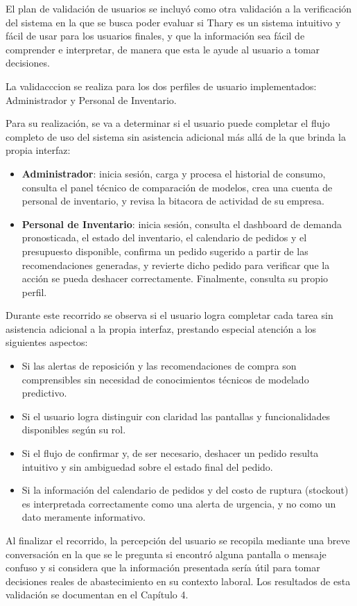 El plan de validación de usuarios se incluyó como otra validación a la verificación del sistema en la que se busca poder evaluar si Thary es un sistema intuitivo y fácil de usar para los usuarios finales, y que la información sea fácil de comprender e interpretar, de manera que esta le ayude al usuario a tomar decisiones.

La validacccion se realiza para los dos perfiles de usuario implementados: Administrador y Personal de Inventario. 

Para su realización, se va a determinar si el usuario puede completar el flujo completo de uso del sistema sin asistencia adicional más allá de la que brinda la propia interfaz:

\begin{itemize}
    \item \textbf{Administrador}: inicia sesión, carga y procesa el historial de consumo, consulta el panel técnico de comparación de modelos, crea una cuenta de personal de inventario, y revisa la bitacora de actividad de su empresa.
    \item \textbf{Personal de Inventario}: inicia sesión, consulta el dashboard de demanda pronosticada, el estado del inventario, el calendario de pedidos y el presupuesto disponible, confirma un pedido sugerido a partir de las recomendaciones generadas, y revierte dicho pedido para verificar que la acción se pueda deshacer correctamente. Finalmente, consulta su propio perfil.
\end{itemize}

Durante este recorrido se observa si el usuario logra completar cada tarea sin asistencia adicional a la propia interfaz, prestando especial atención a los siguientes aspectos:

\begin{itemize}
    \item Si las alertas de reposición y las recomendaciones de compra son comprensibles sin necesidad de conocimientos técnicos de modelado predictivo.
    \item Si el usuario logra distinguir con claridad las pantallas y funcionalidades disponibles según su rol.
    \item Si el flujo de confirmar y, de ser necesario, deshacer un pedido resulta intuitivo y sin ambiguedad sobre el estado final del pedido.
    \item Si la información del calendario de pedidos y del costo de ruptura (stockout) es interpretada correctamente como una alerta de urgencia, y no como un dato meramente informativo.
\end{itemize}

Al finalizar el recorrido, la percepción del usuario se recopila mediante una breve conversación en la que se le pregunta si encontró alguna pantalla o mensaje confuso y si considera que la información presentada sería útil para tomar decisiones reales de abastecimiento en su contexto laboral. Los resultados de esta validación se documentan en el Capítulo 4.